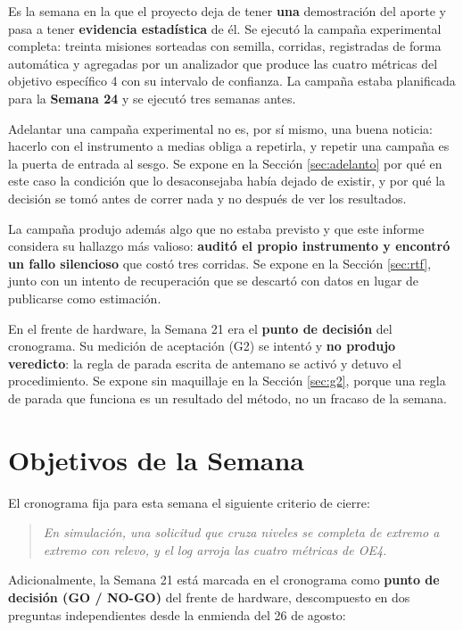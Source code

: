 \documentclass[12pt,letterpaper]{article}
\begin{document}
Es la semana en la que el proyecto deja de tener \textbf{una} demostración del aporte y pasa a tener \textbf{evidencia estadística} de él. Se ejecutó la campaña experimental completa: treinta misiones sorteadas con semilla, corridas, registradas de forma automática y agregadas por un analizador que produce las cuatro métricas del objetivo específico 4 con su intervalo de confianza. La campaña estaba planificada para la \textbf{Semana 24} y se ejecutó tres semanas antes.

Adelantar una campaña experimental no es, por sí mismo, una buena noticia: hacerlo con el instrumento a medias obliga a repetirla, y repetir una campaña es la puerta de entrada al sesgo. Se expone en la Sección \ref{sec:adelanto} por qué en este caso la condición que lo desaconsejaba había dejado de existir, y por qué la decisión se tomó antes de correr nada y no después de ver los resultados.

La campaña produjo además algo que no estaba previsto y que este informe considera su hallazgo más valioso: \textbf{auditó el propio instrumento y encontró un fallo silencioso} que costó tres corridas. Se expone en la Sección \ref{sec:rtf}, junto con un intento de recuperación que se descartó con datos en lugar de publicarse como estimación.

En el frente de hardware, la Semana 21 era el \textbf{punto de decisión} del cronograma. Su medición de aceptación (G2) se intentó y \textbf{no produjo veredicto}: la regla de parada escrita de antemano se activó y detuvo el procedimiento. Se expone sin maquillaje en la Sección \ref{sec:g2}, porque una regla de parada que funciona es un resultado del método, no un fracaso de la semana.

\section{Objetivos de la Semana}

El cronograma fija para esta semana el siguiente criterio de cierre:

\begin{quote}
\textit{En simulación, una solicitud que cruza niveles se completa de extremo a extremo con relevo, y el log arroja las cuatro métricas de OE4.}
\end{quote}

Adicionalmente, la Semana 21 está marcada en el cronograma como \textbf{punto de decisión (GO / NO-GO)} del frente de hardware, descompuesto en dos preguntas independientes desde la enmienda del 26 de agosto:
\end{document}
